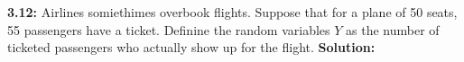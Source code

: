 \documentclass[12pt]{article}
\theoremstyle{homework}
\begin{document}
\textbf{3.12:} Airlines somiethimes overbook flights. Suppose that for a plane of 50 seats, 55 passengers have a ticket. Definine the random variables $Y$
as the number  of ticketed passengers who actually show up for the flight. 
\textbf{Solution:}
\vspace{1in}































































































































\vspace{1in}
\end{document}
